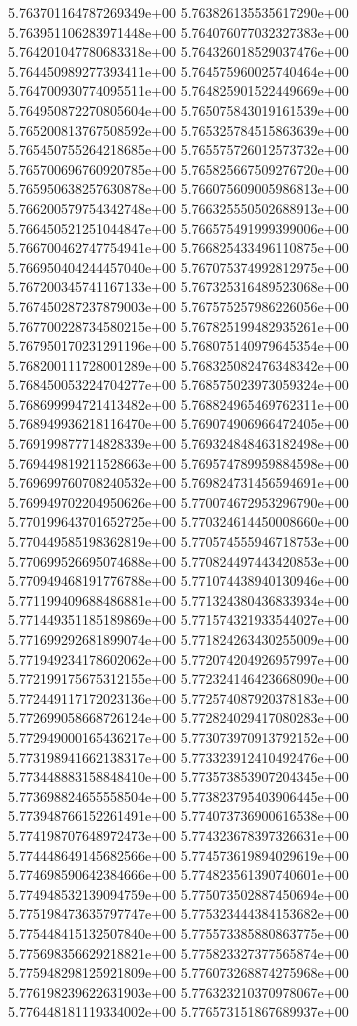 5.763701164787269349e+00
5.763826135535617290e+00
5.763951106283971448e+00
5.764076077032327383e+00
5.764201047780683318e+00
5.764326018529037476e+00
5.764450989277393411e+00
5.764575960025740464e+00
5.764700930774095511e+00
5.764825901522449669e+00
5.764950872270805604e+00
5.765075843019161539e+00
5.765200813767508592e+00
5.765325784515863639e+00
5.765450755264218685e+00
5.765575726012573732e+00
5.765700696760920785e+00
5.765825667509276720e+00
5.765950638257630878e+00
5.766075609005986813e+00
5.766200579754342748e+00
5.766325550502688913e+00
5.766450521251044847e+00
5.766575491999399006e+00
5.766700462747754941e+00
5.766825433496110875e+00
5.766950404244457040e+00
5.767075374992812975e+00
5.767200345741167133e+00
5.767325316489523068e+00
5.767450287237879003e+00
5.767575257986226056e+00
5.767700228734580215e+00
5.767825199482935261e+00
5.767950170231291196e+00
5.768075140979645354e+00
5.768200111728001289e+00
5.768325082476348342e+00
5.768450053224704277e+00
5.768575023973059324e+00
5.768699994721413482e+00
5.768824965469762311e+00
5.768949936218116470e+00
5.769074906966472405e+00
5.769199877714828339e+00
5.769324848463182498e+00
5.769449819211528663e+00
5.769574789959884598e+00
5.769699760708240532e+00
5.769824731456594691e+00
5.769949702204950626e+00
5.770074672953296790e+00
5.770199643701652725e+00
5.770324614450008660e+00
5.770449585198362819e+00
5.770574555946718753e+00
5.770699526695074688e+00
5.770824497443420853e+00
5.770949468191776788e+00
5.771074438940130946e+00
5.771199409688486881e+00
5.771324380436833934e+00
5.771449351185189869e+00
5.771574321933544027e+00
5.771699292681899074e+00
5.771824263430255009e+00
5.771949234178602062e+00
5.772074204926957997e+00
5.772199175675312155e+00
5.772324146423668090e+00
5.772449117172023136e+00
5.772574087920378183e+00
5.772699058668726124e+00
5.772824029417080283e+00
5.772949000165436217e+00
5.773073970913792152e+00
5.773198941662138317e+00
5.773323912410492476e+00
5.773448883158848410e+00
5.773573853907204345e+00
5.773698824655558504e+00
5.773823795403906445e+00
5.773948766152261491e+00
5.774073736900616538e+00
5.774198707648972473e+00
5.774323678397326631e+00
5.774448649145682566e+00
5.774573619894029619e+00
5.774698590642384666e+00
5.774823561390740601e+00
5.774948532139094759e+00
5.775073502887450694e+00
5.775198473635797747e+00
5.775323444384153682e+00
5.775448415132507840e+00
5.775573385880863775e+00
5.775698356629218821e+00
5.775823327377565874e+00
5.775948298125921809e+00
5.776073268874275968e+00
5.776198239622631903e+00
5.776323210370978067e+00
5.776448181119334002e+00
5.776573151867689937e+00
